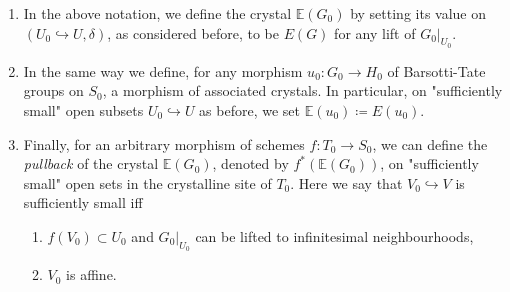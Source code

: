 \begin{defn}[]\label{MessingCrystalDefinition}\leavevmode\vspace{-.2\baselineskip}
\begin{enumerate}
\item In the above notation, we define the crystal $\mathbb{E}(G_0)$
	by setting its value on $\left(U_0 \hookrightarrow U, \delta\right)$, as considered
	before, to be $E(G)$ for any lift of $\left.G_0\right|_{U_0}$.

\item In the same way we define, for any morphism $u_0\colon G_0 \to H_0$ of 
	Barsotti-Tate groups on $S_0$, a morphism of associated crystals.
	In particular, on "sufficiently
	small" open subsets $U_0 \hookrightarrow U$ as before,
	we set $\mathbb{E}(u_0) \coloneqq E(u_0)$.

\item Finally, for an arbitrary morphism of schemes $f\colon T_0 \to S_0$,
	we can define the {\em pullback} of the crystal $\mathbb{E}(G_0)$, denoted
	by $f^* \left( \mathbb{E}(G_0) \right)$, on "sufficiently small" open
	sets in the crystalline site of $T_0$.
	Here we say that $V_0 \hookrightarrow V$ is sufficiently small iff
\begin{enumerate}
	\item $f(V_0) \subset U_0$ and $\left.G_0\right|_{U_0}$ can be lifted to infinitesimal
		neighbourhoods,

	\item $V_0$ is affine.
\end{enumerate}
\end{enumerate}
\end{defn}


